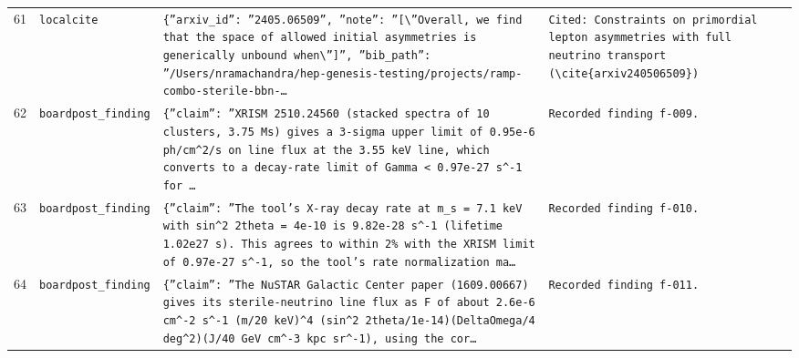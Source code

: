 \documentclass[11pt,a4paper]{article}
\begin{document}
\begin{longtable}{@{}p{}p{}p{}p{}@{}}
61 & \texttt{local}\newline\texttt{cite} & \texttt{\{''arxiv\_\allowbreak{}id'':\allowbreak{} ''2405.06509'',\allowbreak{} ''note'':\allowbreak{} ''[\textbackslash{}\allowbreak{}''Overall,\allowbreak{} we find that the space of allowed initial asymmetries is generically unbound when\textbackslash{}\allowbreak{}'']\allowbreak{}'',\allowbreak{} ''bib\_\allowbreak{}path'':\allowbreak{} ''/\allowbreak{}Users/\allowbreak{}nramachandra/\allowbreak{}hep-genesis-testing/\allowbreak{}projects/\allowbreak{}ramp-combo-sterile-bbn-\ldots{}\allowbreak{}} & \texttt{Cited:\allowbreak{} Constraints on primordial lepton asymmetries with full neutrino transport (\textbackslash{}\allowbreak{}cite\{arxiv240506509\}\allowbreak{})\allowbreak{}} \\
62 & \texttt{board}\newline\texttt{post\_\allowbreak{}finding} & \texttt{\{''claim'':\allowbreak{} ''XRISM 2510.24560 (stacked spectra of 10 clusters,\allowbreak{} 3.75 Ms)\allowbreak{} gives a 3-sigma upper limit of 0.95e-6 ph/\allowbreak{}cm\textasciicircum{}\allowbreak{}2/\allowbreak{}s on line flux at the 3.55 keV line,\allowbreak{} which converts to a decay-rate limit of Gamma \textless{}\allowbreak{} 0.97e-27 s\textasciicircum{}\allowbreak{}-1 for \ldots{}\allowbreak{}} & \texttt{Recorded finding f-009.} \\
63 & \texttt{board}\newline\texttt{post\_\allowbreak{}finding} & \texttt{\{''claim'':\allowbreak{} ''The tool's X-ray decay rate at m\_\allowbreak{}s =\allowbreak{} 7.1 keV with sin\textasciicircum{}\allowbreak{}2 2theta =\allowbreak{} 4e-10 is 9.82e-28 s\textasciicircum{}\allowbreak{}-1 (lifetime 1.02e27 s)\allowbreak{}. This agrees to within 2\% with the XRISM limit of 0.97e-27 s\textasciicircum{}\allowbreak{}-1,\allowbreak{} so the tool's rate normalization ma\ldots{}\allowbreak{}} & \texttt{Recorded finding f-010.} \\
64 & \texttt{board}\newline\texttt{post\_\allowbreak{}finding} & \texttt{\{''claim'':\allowbreak{} ''The NuSTAR Galactic Center paper (1609.00667)\allowbreak{} gives its sterile-neutrino line flux as F of about 2.6e-6 cm\textasciicircum{}\allowbreak{}-2 s\textasciicircum{}\allowbreak{}-1 (m/\allowbreak{}20 keV)\allowbreak{}\textasciicircum{}\allowbreak{}4 (sin\textasciicircum{}\allowbreak{}2 2theta/\allowbreak{}1e-14)\allowbreak{}(DeltaOmega/\allowbreak{}4 deg\textasciicircum{}\allowbreak{}2)\allowbreak{}(J/\allowbreak{}40 GeV cm\textasciicircum{}\allowbreak{}-3 kpc sr\textasciicircum{}\allowbreak{}-1)\allowbreak{},\allowbreak{} using the cor\ldots{}\allowbreak{}} & \texttt{Recorded finding f-011.} \\

\end{longtable}
\end{document}
